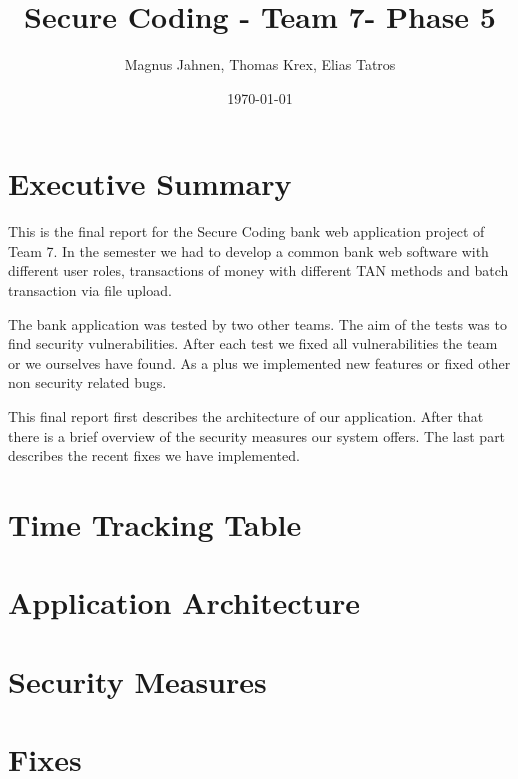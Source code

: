 \documentclass{report}
\title{Secure Coding - Team 7- Phase 5}
\author{Magnus Jahnen, Thomas Krex, Elias Tatros}
\date{\today}
\begin{document}
\maketitle

\part{Executive Summary}

This is the final report for the Secure Coding bank web application project of Team 7. In the semester we had to develop a common bank web software with different user roles, transactions of money with different TAN methods and batch transaction via file upload.

The bank application was tested by two other teams. The aim of the tests was to find security vulnerabilities. After each test we fixed all vulnerabilities the team or we ourselves have found. As a plus we implemented new features or fixed other non security related bugs.

This final report first describes the architecture of our application. After that there is a brief overview of the security measures our system offers. The last part describes the recent fixes we have implemented.

\tableofcontents

\part{Time Tracking Table}



\part{Application Architecture}


\part{Security Measures}



\part{Fixes}








\end{document}
